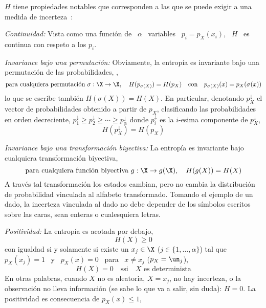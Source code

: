 $H$ tiene propiedades notables que corresponden  a las que se puede exigir a una
medida de incerteza~\cite{Sha48, ShaWea64, CovTho06, Rio07, DemCov91, Joh04}:
%
\begin{propiedades}
\item\label{prop:SZ:continuidad} {\it Continuidad:}  Vista como una funci\'on de
  \ $\alpha$ \ variables  \ $p_i = p_X(x_i)$, \ $H$ \  es continua con respeto a
  los $p_i$.
%
\setcounter{PropPermutacion}{\value{enumi}}
\item\label{prop:SZ:permutacion}   {\it  Invariance  bajo   una  permutaci\'on:}
  Obviamente,  la  entrop\'ia  es  invariante  bajo  una  permutaci\'on  de  las
  probabilidades, \ie,
  \[
  \mbox{para   cualquiera   permutaci\'on   }   \sigma:   \X   \to   \X,   \quad
  H(p_{\sigma(X)})   =  H(p_X)   \quad  \mbox{con}   \quad   p_{\sigma(X)}(x)  =
  p_X(\sigma(x))
  \]
  lo que se  escribe tambi\'en $H(\sigma(X)) = H(X)$.   En particular, denotando
  $p_X^\downarrow$  el vector  de  probabilidades obtenido  a  partir de  $p_X$,
  clasificando  las  probabilidades en  orden  decreciente, $p_1^\downarrow  \ge
  p_2^\downarrow \ge  \cdots \ge p_\alpha^\downarrow$  donde $p_i^\downarrow$ es
  la $i$-esima componente de $p_X^\downarrow$,
  \[
  H(p_X^\downarrow) = H(p_X)
  \]
%
\setcounter{PropBiyeccion}{\value{enumi}}
\item\label{prop:SZ:biyeccion}   {\it  Invariance   bajo   una  transformaci\'on
    biyectiva:}  La entrop\'ia  es invariante  bajo  cualquiera transformaci\'on
  biyectiva, \ie
  \[
  \mbox{para cualquiera  funci\'on biyectiva } g:  \X \to g(\X),  \quad H(g(X)) =
  H(X)
  \]
  A  trav\'es  tal transformaci\'on  los  estados  cambian,  pero no  cambia  la
  distribuci\'on de probabilidad vinculada al alfabeto transformado.  Tomando el
  ejemplo de  un dado, la  incerteza vinculada al  dado no debe depender  de los
  s\'imbolos escritos sobre las caras, sean enteras o cualesquiera letras.
%
\item\label{prop:SZ:positividad} {\it Positividad:} La entrop\'ia es acotada por
  debajo,
  \[
  H(X) \ge 0 
  \]
  con igualdad si y solamente si existe un  $x_j \in \X$ ($j \in \{ 1 , \ldots ,
  \alpha \}$) tal  que $p_X(x_j) = 1$  \ y \ $p_X(x) =  0$ \ para \  $x \ne x_j$
  ($p_X = \un_j$),
  \[
  H(X)  =  0 \quad  \mbox{ssi}  \quad X  \mbox{  es  determinista}
  \]
  En  otras  palabras, cuando  $X$  no  es aleatoria,  \ie  $X  =  x_j$, no  hay
  incerteza, o  la observaci\'on  no lleva  informaci\'on (se sabe  lo que  va a
  salir, sin duda): $H = 0$.   La positividad es consecuencia de $p_X(x) \le 1$,

\end{propiedades}
